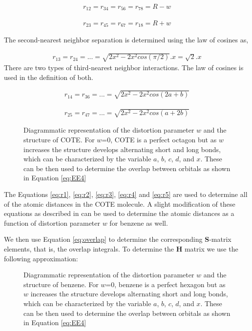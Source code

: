 \documentclass[9pt,twocolumn,twoside]{optica}
\begin{document}
\begin{align}
r_{12}=r_{34}=r_{56}=r_{78}=R-w
\label{eq:r1}
\end{align}

\begin{align}
r_{23}=r_{45}=r_{67}=r_{18}=R+w
\label{eq:r2}
\end{align}

The second-nearest neighbor separation is determined
using the law of cosines as,

\begin{align}
r_{13}=r_{24}=...=\sqrt{2x^2-2x^2cos(\pi/2)}.x=\sqrt{2}.x
\label{eq:r3}
\end{align}
There are two types of third-nearest neighbor interactions.
The law of cosines is used in the definition of both.

\begin{align}
r_{14}=r_{36}=...=\sqrt{2x^2-2x^2cos(2a+b)}
\label{eq:r4}
\end{align}

\begin{align}
r_{25}=r_{47}=...=\sqrt{2x^2-2x^2cos(a+2b)}
\label{eq:r5}
\end{align}



\begin{figure}[htbp]
\centering
{}
\caption{Diagrammatic representation of the distortion parameter $w$ and the structure of COTE. For $w$=0, COTE is a perfect octagon but as $w$ increases the structure develops alternating short and long bonds, which can be characterized by the variable $a$, $b$, $c$, $d$, and $x$. These can be then used to determine the overlap between orbitals as shown in Equation \ref{eq:EE4} }
\label{fig:cote}
\end{figure}

The Equations \ref{eq:r1}, \ref{eq:r2}, \ref{eq:r3}, \ref{eq:r4} and  \ref{eq:r5} are used to determine all of the atomic distances in the COTE molecule. A slight modification of these equations as described in \cite{wiki1} can be used to determine the atomic distances as a function of distortion parameter $w$ for benzene as well. 

We then use Equation \ref{eq:overlap} to determine the corresponding \textbf{S}-matrix elements, that is, the overlap integrals. To determine the \textbf{H} matrix we use the following approximation:

\begin{figure}[htbp]
\centering
{}
\caption{Diagrammatic representation of the distortion parameter $w$ and the structure of benzene. For $w$=0, benzene is a perfect hexagon but as $w$ increases the structure develops alternating short and long bonds, which can be characterized by the variable $a$, $b$, $c$, $d$, and $x$. These can be then used to determine the overlap between orbitals as shown in Equation \ref{eq:EE4}}
\label{fig:benzene}
\end{figure}
\end{document}
